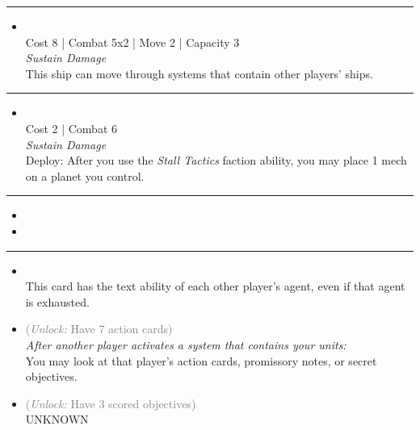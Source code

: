 \begin{multicols}{2}
\vspace{-10pt}\rule{\hsize}{0.4pt}\vspace{5pt}


\begin{itemize}
\item {}\\
Cost 8 | Combat 5x2 | Move 2 | Capacity 3 \\
\emph{Sustain Damage}\\
This ship can move through systems that contain other players' ships.
\end{itemize}

\vspace{-10pt}\rule{\hsize}{0.4pt}\vspace{5pt}


\begin{itemize}
\item {} %
\\
Cost 2 | Combat 6
\\
\emph{Sustain Damage}
\\
Deploy: After you use the \emph{Stall Tactics} faction ability, you may place 1 mech on a planet you control. 
\end{itemize}

\vspace{-10pt}\rule{\hsize}{0.4pt}\vspace{5pt}

\nounits

\columnbreak
{}

\begin{itemize}
\item \transparasteel
\item \mageon
\end{itemize}

\vspace{-10pt}\rule{\hsize}{0.4pt}\vspace{5pt}


\begin{itemize}
\item {}\\
This card has the text ability of each other player's agent, even if that agent is exhausted. 
\item {} \textcolor{gray}{(\emph{Unlock:} Have 7 action cards)} \\
\emph{After another player activates a system that contains your units:}\\ You may look at that player's action cards, promissory notes, or secret objectives.
\item {} \textcolor{gray}{(\emph{Unlock:} Have 3 scored objectives)}\\
UNKNOWN
\end{itemize}


\end{multicols}
